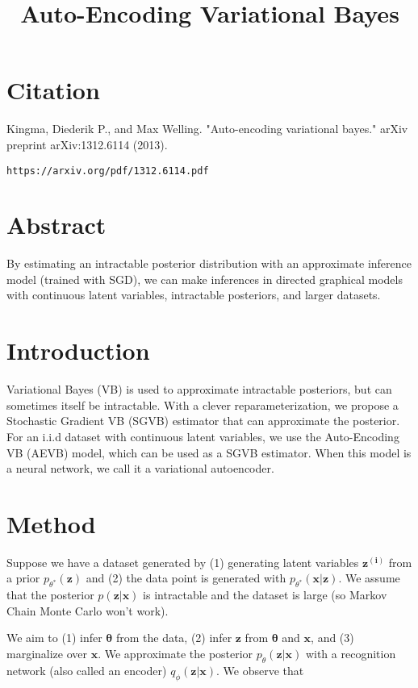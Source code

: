 \documentclass[a4paper]{article}
\title{Auto-Encoding Variational Bayes}
\date{}
\begin{document}
\maketitle

\section{Citation}
Kingma, Diederik P., and Max Welling. "Auto-encoding variational bayes." arXiv preprint arXiv:1312.6114 (2013).

\begin{verbatim}
https://arxiv.org/pdf/1312.6114.pdf
\end{verbatim}

\section{Abstract}
By estimating an intractable posterior distribution with an approximate 
inference model (trained with SGD), we can make inferences in directed
graphical models with continuous latent variables, intractable posteriors,
and larger datasets.

\section{Introduction}
Variational Bayes (VB) is used to approximate intractable posteriors, but can 
sometimes itself be intractable. With a clever reparameterization, we propose
a Stochastic Gradient VB (SGVB) estimator that can approximate the posterior.
For an i.i.d dataset with continuous latent variables, we use the Auto-Encoding
VB (AEVB) model, which can be used as a SGVB estimator. When this model is a
neural network, we call it a variational autoencoder.

\section{Method}
Suppose we have a dataset generated by (1) generating latent variables 
$\bm{z^{(i)}}$  from a prior $p_{\theta^*}(\bm{z})$ and (2) the data point
is generated with $p_{\theta^*}(\bm{x} | \bm{z})$. We assume that the posterior
$p(\bm{z} | \bm{x})$ is intractable and the dataset is large (so Markov Chain
Monte Carlo won't work).

We aim to (1) infer $\bm{\theta}$ from the data, (2) infer $\bm{z}$ from
$\bm{\theta}$ and $\bm{x}$, and (3) marginalize over $\bm{x}$. We approximate
the posterior $p_{\theta}(\bm{z} | \bm{x})$ with a recognition
network (also called an encoder) $q_{\phi}(\bm{z} | \bm{x})$. We observe that
\end{document}
